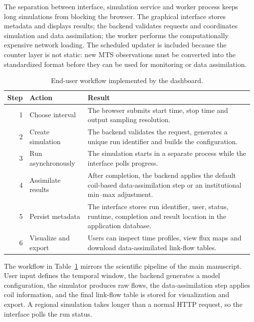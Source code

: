 \documentclass[11pt,a4paper]{article}
\begin{document}
The separation between interface, simulation service and worker process keeps long simulations from blocking the browser. The graphical interface stores metadata and displays results; the backend validates requests and coordinates simulation and data assimilation; the worker performs the computationally expensive network loading. The scheduled updater is included because the counter layer is not static: new MTS observations must be converted into the standardized format before they can be used for monitoring or data assimilation.

\begin{table}[htbp]
\centering
\caption{End-user workflow implemented by the dashboard.}
\label{tab:web-workflow}
\begin{tabularx}{\linewidth}{@{}rlX@{}}
\toprule
Step & Action & Result \\
\midrule
1 & Choose interval & The browser submits start time, stop time and output
sampling resolution. \\
2 & Create simulation & The backend validates the request, generates a unique
run identifier and builds the configuration. \\
3 & Run asynchronously & The simulation starts in a separate process while
the interface polls progress. \\
4 & Assimilate results & After completion, the backend applies the default
coil-based data-assimilation step or an institutional min--max adjustment. \\
5 & Persist metadata & The interface stores run identifier, user, status,
runtime, completion and result location in the application database. \\
6 & Visualize and export & Users can inspect time profiles, view flux maps
and download data-assimilated link-flow tables. \\
\bottomrule
\end{tabularx}
\end{table}

The workflow in Table~\ref{tab:web-workflow} mirrors the scientific pipeline of the main manuscript. User input defines the temporal window, the backend generates a model configuration, the simulator produces raw flows, the data-assimilation step applies coil information, and the final link-flow table is stored for visualization and export. A regional simulation takes longer than a normal HTTP request, so the interface polls the run status.
\end{document}

